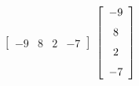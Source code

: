 {$\left[ \begin {array}{cccc} -9&8&2&-7\end {array} \right] $}
{$ \left[ \begin {array}{c} -9\\\noalign{\medskip}8\\\noalign{\medskip}2
\\\noalign{\medskip}-7\end {array} \right]$}



